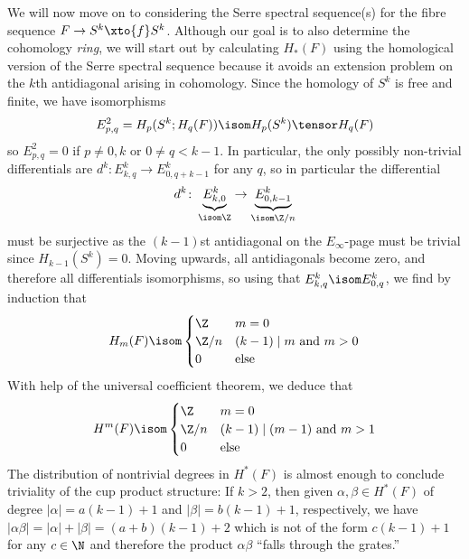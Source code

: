 \begin{solution}
	We will now move on to considering the Serre spectral sequence(s) for the fibre sequence $F \to S^k \xto{f} S^k$.
	Although our goal is to also determine the cohomology \emph{ring}, we will start out by calculating $H_*(F)$ using the homological version of the Serre spectral sequence because it avoids an extension problem on the $k$th antidiagonal arising in cohomology.
	Since the homology of $S^k$ is free and finite, we have isomorphisms
	\begin{equation*}
		E^2_{p, q} = H_p(S^k; H_q(F)) \isom H_p(S^k) \tensor H_q(F)
	\end{equation*}
	so $E^2_{p, q} = 0$ if $p \neq 0, k$ or $0 \neq q < k - 1$.
	In particular, the only possibly non-trivial differentials are $d^k\colon E^k_{k, q} \to E^k_{0, q + k - 1}$ for any $q$, so in particular the differential
	\begin{equation*}
		d^k\colon \underbrace{E^k_{k, 0}}_{\isom \Z} \to \underbrace{E^k_{0, k - 1}}_{\isom \Zn{n}}
	\end{equation*}
	must be surjective as the $(k - 1)$st antidiagonal on the $E_\infty$-page must be trivial since $H_{k - 1}(S^k) = 0$.
	Moving upwards, all antidiagonals become zero, and therefore all differentials isomorphisms, so using that $E^k_{k, q} \isom E^k_{0, q}$, we find by induction that 
	\begin{equation*}
		H_m(F) \isom \begin{cases}
			\Z 		& m = 0 \\
			\Zn{n} 	& (k - 1) \mid m \text{ and } m > 0 \\
			0 		& \text{else}
		\end{cases}
	\end{equation*}
	With help of the universal coefficient theorem, we deduce that
	\begin{equation*}
		H^m(F) \isom \begin{cases}
			\Z 		& m = 0 \\
			\Zn{n} 	& (k - 1) \mid (m - 1) \text{ and } m > 1 \\
			0 		& \text{else}
		\end{cases}
	\end{equation*}
	The distribution of nontrivial degrees in $H^*(F)$ is almost enough to conclude triviality of the cup product structure:
	If $k > 2$, then given $\alpha, \beta \in H^*(F)$ of degree $|\alpha| = a (k - 1) + 1$ and $|\beta| = b (k - 1) + 1$, respectively, we have $|\alpha \beta| = |\alpha| + |\beta| = (a + b)(k - 1) + 2$ which is not of the form $c(k - 1) + 1$ for any $c \in \N$ and therefore the product $\alpha \beta$ \enquote{falls through the grates.} 

\end{solution}
